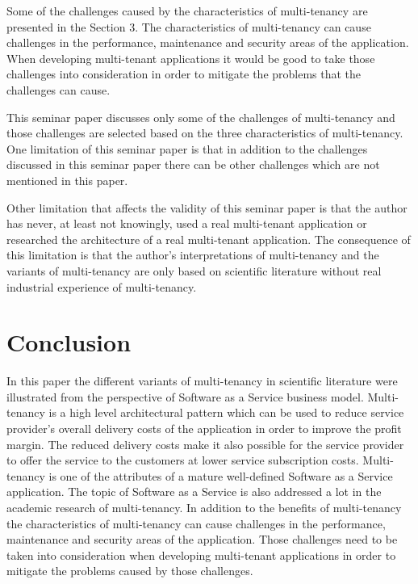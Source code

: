\documentclass[conference]{sasmoota2017}
\begin{document}
Some of the challenges caused by the characteristics of multi-tenancy are presented in the Section 3. The characteristics of multi-tenancy can cause challenges in the performance, maintenance and security areas of the application. When developing multi-tenant applications it would be good to take those challenges into consideration in order to mitigate the problems that the challenges can cause. 

This seminar paper discusses only some of the challenges of multi-tenancy and those challenges are selected based on the three characteristics of multi-tenancy. One limitation of this seminar paper is that in addition to the challenges discussed in this seminar paper there can be other challenges which are not mentioned in this paper. 

Other limitation that affects the validity of this seminar paper is that the author has never, at least not knowingly, used a real multi-tenant application or researched the architecture of a real multi-tenant application. The consequence of this limitation is that the author's interpretations of multi-tenancy and the variants of multi-tenancy are only based on scientific literature without real industrial experience of multi-tenancy. 

\section{Conclusion}

In this paper the different variants of multi-tenancy in scientific literature were illustrated from the perspective of Software as a Service business model. Multi-tenancy is a high level architectural pattern which can be used to reduce service provider's overall delivery costs of the application in order to improve the profit margin. The reduced delivery costs make it also possible for the service provider to offer the service to the customers at lower service subscription costs. Multi-tenancy is one of the attributes of a mature well-defined Software as a Service application. The topic of Software as a Service is also addressed a lot in the academic research of multi-tenancy. In addition to the benefits of multi-tenancy the characteristics of multi-tenancy can cause challenges in the performance, maintenance and security areas of the application. Those challenges need to be taken into consideration when developing multi-tenant applications in order to mitigate the problems caused by those challenges. 
\end{document}
